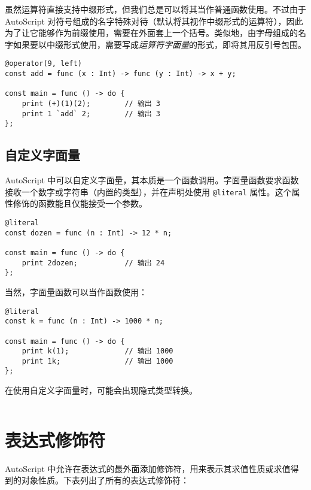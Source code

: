 虽然运算符直接支持中缀形式，但我们总是可以将其当作普通函数使用。不过由于 AutoScript 对符号组成的名字特殊对待（默认将其视作中缀形式的运算符），因此为了让它能够作为前缀使用，需要在外面套上一个括号。类似地，由字母组成的名字如果要以中缀形式使用，需要写成\emph{运算符字面量}的形式，即将其用反引号包围。

\begin{lstlisting}
@operator(9, left)
const add = func (x : Int) -> func (y : Int) -> x + y;

const main = func () -> do {
    print (+)(1)(2);        // 输出 3
    print 1 `add` 2;        // 输出 3
};
\end{lstlisting}

\subsection{自定义字面量}

AutoScript 中可以自定义字面量，其本质是一个函数调用。字面量函数要求函数接收一个数字或字符串（内置的类型），并在声明处使用 \lstinline!@literal! 属性。这个属性修饰的函数能且仅能接受一个参数。

\begin{lstlisting}
@literal
const dozen = func (n : Int) -> 12 * n;

const main = func () -> do {
	print 2dozen;			// 输出 24
};
\end{lstlisting}

当然，字面量函数可以当作函数使用：

\begin{lstlisting}
@literal
const k = func (n : Int) -> 1000 * n;

const main = func () -> do {
	print k(1);				// 输出 1000
	print 1k;				// 输出 1000
};
\end{lstlisting}

在使用自定义字面量时，可能会出现隐式类型转换。

\begin{lstlisting}

\end{lstlisting}

\section{表达式修饰符}

AutoScript 中允许在表达式的最外面添加修饰符，用来表示其求值性质或求值得到的对象性质。下表列出了所有的表达式修饰符：

